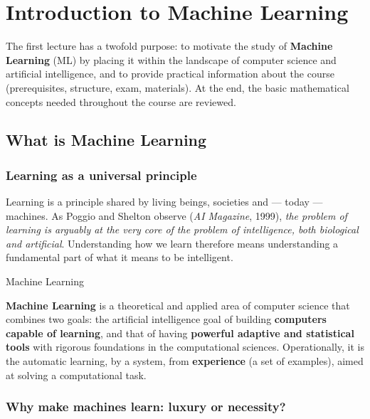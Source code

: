 \chapter{Introduction to Machine Learning}\label{ch-01}

The first lecture has a twofold purpose: to motivate the study of
\textbf{Machine Learning} (ML) by placing it within the landscape of
computer science and artificial intelligence, and to provide practical
information about the course (prerequisites, structure, exam,
materials). At the end, the basic mathematical concepts needed
throughout the course are reviewed.

\section{What is Machine
Learning}\label{che-cosuxe8-il-machine-learning}

\subsection{Learning as a universal
principle}\label{lapprendimento-come-principio-universale}

Learning is a principle shared by living beings, societies and ---
today --- machines. As Poggio and Shelton observe (\emph{AI Magazine},
1999), \emph{the problem of learning is arguably at the very core of the
problem of intelligence, both biological and artificial}. Understanding
how we learn therefore means understanding a fundamental part of what
it means to be intelligent.

\begin{boxdefinition}{Machine Learning}

\textbf{Machine Learning} is a theoretical and applied area of computer
science that combines two goals: the artificial intelligence goal of
building \textbf{computers capable of learning}, and that of having
\textbf{powerful adaptive and statistical tools} with rigorous
foundations in the computational sciences. Operationally, it is the
automatic learning, by a system, from \textbf{experience} (a set of
examples), aimed at solving a computational task.

\end{boxdefinition}

\subsection{Why make machines learn: luxury or
necessity?}\label{perchuxe9-far-apprendere-le-macchine-lusso-o-necessituxe0}

